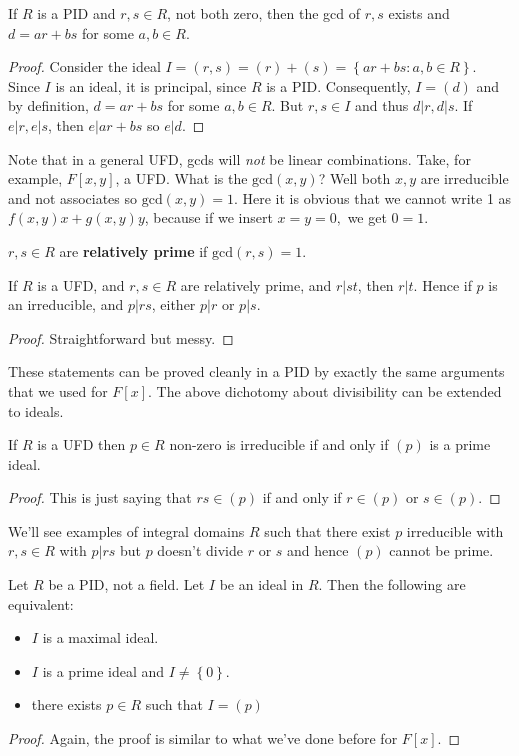 \documentclass{../mathnotes}
\begin{document}
\begin{thm}
    If $R$ is a PID and $r,s\in R$, not both zero, then the gcd of $r,s$ exists and $d=ar+bs$ for some $a,b\in R$.
\end{thm}
\begin{proof}
    Consider the ideal $I=(r,s)=(r)+(s)=\left\{ ar+bs:a,b\in R \right\}$. Since $I$ is an ideal, it is principal, since $R$ is a PID.
    Consequently, $I=(d)$ and by definition, $d=ar+bs$ for some $a,b\in R$. But $r,s\in I$ and thus $d|r,d|s$. If $e|r,e|s$, then $e|ar+bs$ so $e|d$.
\end{proof}

Note that in a general UFD, gcds will \textit{not} be linear combinations. Take, for example, $F[x,y]$, a UFD. What is the $\text{gcd}(x,y)$? Well both
$x,y$ are irreducible and not associates so $\text{gcd}(x,y)=1$. Here it is obvious that we cannot write 1 as $f(x,y)x+g(x,y)y$, because if we insert
$x=y=0,$ we get $0=1$.

\begin{defn}
    $r,s\in R$ are \textbf{relatively prime} if $\text{gcd}(r,s)=1$.
\end{defn}

\begin{thm}
    If $R$ is a UFD, and $r,s\in R$ are relatively prime, and $r|st$, then $r|t$.
    Hence if $p$ is an irreducible, and $p|rs$, either $p|r$ or $p|s$.
\end{thm}
\begin{proof}
    Straightforward but messy.
\end{proof}

These statements can be proved cleanly in a PID by exactly the same arguments that we used for $F[x]$.
The above dichotomy about divisibility can be extended to ideals.

\begin{thm}
    If $R$ is a UFD then $p\in R$ non-zero is irreducible if and only if $(p)$ is a prime ideal.
\end{thm}
\begin{proof}
    This is just saying that $rs\in(p)$ if and only if $r\in(p)$ or $s\in(p)$.
\end{proof}

We'll see examples of integral domains $R$ such that there exist $p$ irreducible with $r,s\in R$ with $p|rs$ but $p$
doesn't divide $r$ or $s$ and hence $(p)$ cannot be prime.

\begin{thm}
    Let $R$ be a PID, not a field. Let $I$ be an ideal in $R$. Then the following are equivalent:
    \begin{itemize}
        \item $I$ is a maximal ideal.
        \item $I$ is a prime ideal and $I\neq\left\{0 \right\}$.
        \item there exists $p\in R$ such that $I=(p)$
    \end{itemize}
\end{thm}
\begin{proof}
    Again, the proof is similar to what we've done before for $F[x]$.
\end{proof}
\end{document}
